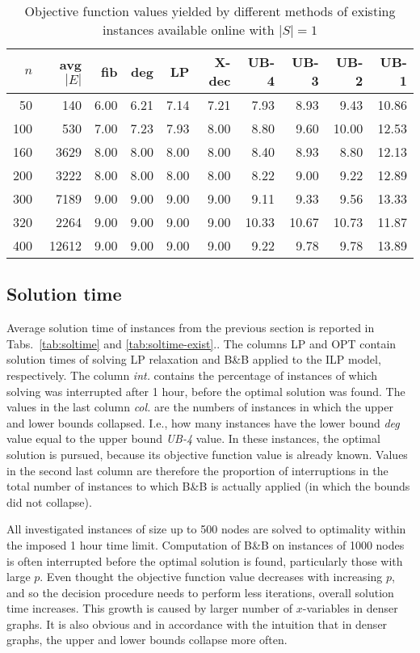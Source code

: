 \begin{table}[]
\centering
\begin{tabular}{rrrrrrrrrr}
$n$     &	avg $|E|$ & fib  & deg  & LP    & X-dec & UB-4  & UB-3  & UB-2  & UB-1  \\
\hline
  50 & 140  & 6.00 & 6.21 & 7.14 & 7.21 & 7.93 & 8.93  & 9.43  & 10.86 \\
 100 & 530  & 7.00 & 7.23 & 7.93 & 8.00 & 8.80 & 9.60  & 10.00 & 12.53 \\
 160 &3629  & 8.00 & 8.00 & 8.00 & 8.00 & 8.40 & 8.93  & 8.80  & 12.13 \\
 200 &3222  & 8.00 & 8.00 & 8.00 & 8.00 & 8.22 & 9.00  & 9.22  & 12.89 \\
 300 &7189  & 9.00 & 9.00 & 9.00 & 9.00 & 9.11 & 9.33  & 9.56  & 13.33 \\
 320 &2264  & 9.00 & 9.00 & 9.00 & 9.00 &10.33 &10.67  &10.73  & 11.87 \\
 400 &12612 & 9.00 & 9.00 & 9.00 & 9.00 & 9.22 & 9.78  & 9.78  & 13.89 \\
\end{tabular}
\caption{Objective function values yielded by different methods of existing instances available online with $|S|=1$}
\label{tab:obj-exist}
\end{table}

\subsection{Solution time}

Average solution time of instances from the previous section is reported in Tabs.~\ref{tab:soltime} and \ref{tab:soltime-exist}..
The columns LP and OPT contain solution times of solving LP relaxation and B\&B applied to the ILP model, respectively.
The column \emph{int.} contains the percentage of instances of which solving was interrupted after 1 hour, before the optimal solution was found.
The values in the last column \emph{col.} are the numbers of instances in which the upper and lower bounds collapsed. 
I.e., how many instances have the lower bound \emph{deg} value equal to the upper bound \emph{UB-4} value.
In these instances, the optimal solution is pursued, because its objective function value is already known.
Values in the second last column are therefore the proportion of interruptions in the total number of instances to which B\&B is actually applied 
(in which the bounds did not collapse).

All investigated instances of size up to 500 nodes are solved to optimality within the imposed 1 hour time limit.
Computation of B\&B on instances of 1000 nodes is often interrupted before the optimal solution is found, particularly those with large $p$.
Even thought the objective function value decreases with increasing $p$, and so the decision procedure needs to perform less iterations, overall solution time increases.
This growth is caused by larger number of $x$-variables in denser graphs.
It is also obvious and in accordance with the intuition that in denser graphs, the upper and lower bounds collapse more often.


